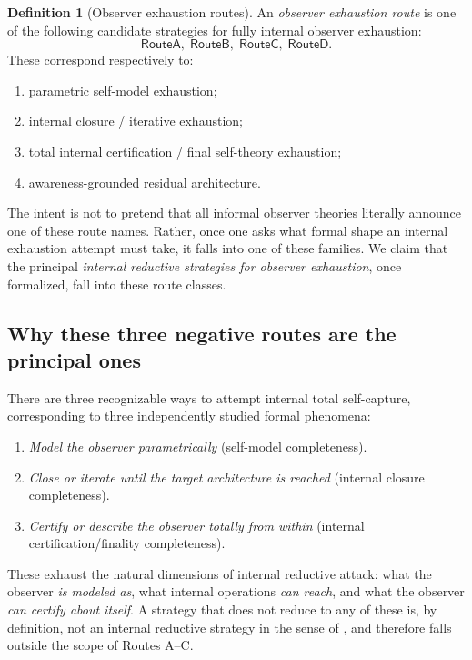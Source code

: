 \documentclass[11pt]{article}
\theoremstyle{plain}
\theoremstyle{definition}
\newtheorem{definition}[theorem]{Definition}
\theoremstyle{remark}
\newcommand{\RouteA}{\mathsf{RouteA}}
\newcommand{\RouteB}{\mathsf{RouteB}}
\newcommand{\RouteC}{\mathsf{RouteC}}
\newcommand{\RouteD}{\mathsf{RouteD}}
\begin{document}
\begin{definition}[Observer exhaustion routes]
\label{def:routes}
An \emph{observer exhaustion route} is one of the following candidate
strategies for fully internal observer exhaustion:
\[
  \RouteA,\;\RouteB,\;\RouteC,\;\RouteD.
\]
These correspond respectively to:
\begin{enumerate}[label=(\alph*),nosep]
\item parametric self-model exhaustion;
\item internal closure / iterative exhaustion;
\item total internal certification / final self-theory exhaustion;
\item awareness-grounded residual architecture.
\end{enumerate}
\end{definition}

The intent is not to pretend that all informal observer theories literally
announce one of these route names.  Rather, once one asks what formal shape
an internal exhaustion attempt must take, it falls into one of these
families.  We claim that the principal \emph{internal reductive strategies
for observer exhaustion}, once formalized, fall into these route classes.

\subsection*{Why these three negative routes are the principal ones}

There are three recognizable ways to attempt internal total
self-capture, corresponding to three independently studied formal
phenomena:
\begin{enumerate}[label=(\arabic*),nosep]
\item \emph{Model the observer parametrically} (self-model completeness).
\item \emph{Close or iterate until the target architecture is reached}
      (internal closure completeness).
\item \emph{Certify or describe the observer totally from within}
      (internal certification/finality completeness).
\end{enumerate}
These exhaust the natural dimensions of internal reductive attack: what
the observer \emph{is modeled as}, what internal operations \emph{can
reach}, and what the observer \emph{can certify about itself}.  A strategy
that does not reduce to any of these is, by definition, not an internal
reductive strategy in the sense of , and therefore
falls outside the scope of Routes A--C.
\end{document}
